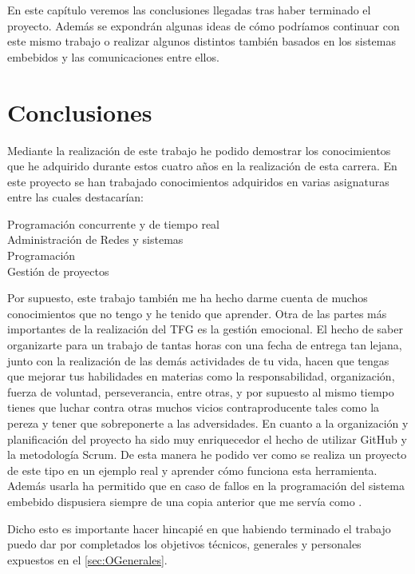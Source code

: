 
En este capítulo veremos las conclusiones llegadas tras haber terminado el proyecto. Además se expondrán algunas ideas de cómo podríamos continuar con este mismo trabajo o realizar algunos distintos también basados en los sistemas embebidos y las comunicaciones entre ellos.


\section{Conclusiones} \label{sec:Conclusiones}
Mediante la realización de este trabajo he podido demostrar los conocimientos que he adquirido durante estos cuatro  años en la realización de esta carrera. En este proyecto se han trabajado conocimientos adquiridos en varias asignaturas entre las cuales destacarían:

\begin{description}
\item[Programación concurrente y de tiempo real]
\item[Administración de Redes y sistemas]
\item[Programación]
\item[Gestión de proyectos]
\end{description}

Por supuesto, este trabajo también me ha hecho darme cuenta de muchos conocimientos que no tengo y he tenido que aprender.
Otra de las partes más importantes de la realización del TFG es la gestión emocional. El hecho de saber organizarte para un trabajo de tantas horas con una fecha de entrega tan lejana, junto con la realización de las demás actividades de tu vida, hacen que tengas que mejorar tus habilidades en materias como la responsabilidad, organización, fuerza de voluntad, perseverancia, entre otras, y por supuesto al mismo tiempo tienes que luchar contra otras muchos vicios contraproducente tales como la pereza y tener que sobreponerte a las adversidades. 
En cuanto a la organización y planificación del proyecto ha sido muy enriquecedor el hecho de utilizar GitHub y la metodología Scrum. De esta manera he podido ver como se realiza un proyecto de este tipo en un ejemplo real y aprender cómo funciona esta herramienta. Además usarla ha permitido que en caso de fallos en la programación del sistema embebido dispusiera siempre de una copia anterior que me servía como .

Dicho esto es importante hacer hincapié en que habiendo terminado el trabajo puedo dar por completados los objetivos técnicos, generales y personales expuestos en el \ref{sec:OGenerales}. 

